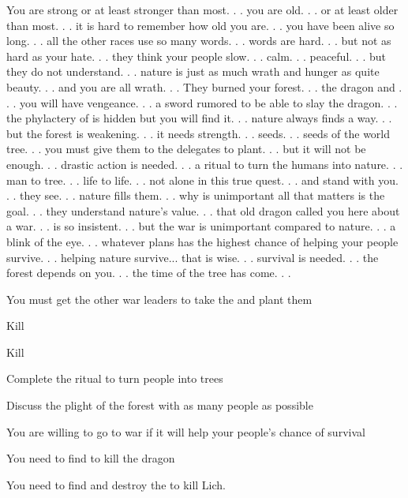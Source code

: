 \documentclass[char]{guildcamp2}
\begin{document}
\name{\cEnt{}}




You are strong or at least stronger than most. . . you are old. . . or at least older than most. . . it is hard to remember how old you are. . . you have been alive so long. . . all the other races use so many words. . . words are hard. . . but not as hard as your hate. . . they think your people slow. . . calm. . . peaceful. . . but they do not understand. . . nature is just as much wrath and hunger as quite beauty. . . and you are all wrath. . . They burned your forest. . . \cRed{} the dragon and \cLich{}. . . you will have vengeance. . . a sword rumored to be able to slay the dragon. . . the phylactery of \cLich{} is hidden but you will find it. . . nature always finds a way. . .  but the forest is weakening. . . it needs strength. . . seeds. . . seeds of the world tree. . . you must give them to the delegates to plant. . . but it will not be enough. . . drastic action is needed. . . a ritual to turn the humans into nature. . . man to tree. . . life to life. . . not alone in this true quest. . . \cTreeFae{} and \cTroll{} stand with you. . . they see. . . nature fills them. . . why is unimportant all that matters is the goal. . . they understand nature's value. . . that old dragon called you here about a war. . . \cOnyx{} is so insistent. . . but the war is unimportant compared to nature. . . a blink of the eye. . . whatever plans has the highest chance of helping your people survive. . . helping nature survive... that is wise. . . survival is needed. . . the forest depends on you. . . the time of the tree has come. . .

\begin{itemz}[Goals]
  \item You must get the other war leaders to take the \iSeedoftheWorldTree{} and plant them
  \item Kill \cRed{}
	\item Kill \cLich{}
  \item Complete the ritual to turn people into trees
	\item Discuss the plight of the forest with as many people as possible
\end{itemz}

\begin{itemz}[Notes]
  \item You are willing to go to war if it will help your people's chance of survival 
  \item You need to find \iSwordofIce{} to kill the dragon
	\item You need to find and destroy the \iPhylactery{} to kill Lich.
\end{itemz}
\end{document}
